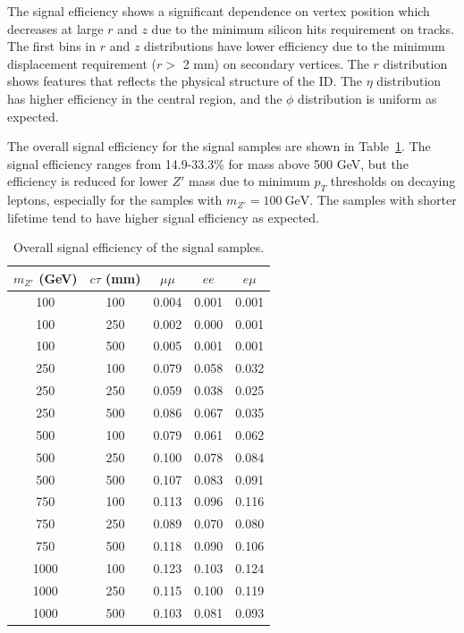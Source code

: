 The signal efficiency shows a significant dependence on vertex position which decreases at large $r$ and $z$ due to the minimum silicon hits requirement on tracks. The first bins in $r$ and $z$ distributions have lower efficiency due to the minimum displacement requirement ($r > $ 2 mm) on secondary vertices. The $r$ distribution shows features that reflects the physical structure of the ID. The $\eta$ distribution has higher efficiency in the central region, and the $\phi$ distribution is uniform as expected.

The overall signal efficiency for the signal samples are shown in Table~\ref{table:signal_eff}. The signal efficiency ranges from 14.9-33.3\% for mass above 500 GeV, but the efficiency is reduced for lower $Z'$ mass due to minimum $p_{T}$ thresholds on decaying leptons, especially for the samples with $m_{Z'}=100~\si{\GeV}$. The samples with shorter lifetime tend to have higher signal efficiency as expected. 

\begin{table}[!htb]
  \centering
  \begin{tabular}{ c c @{\hspace{1cm}} c @{\hspace{1cm}} c @{\hspace{1cm}} c }
    \hline
    \hline
    $m_{Z'}$ (GeV) & $c\tau$ (mm)   &$\mu\mu$  & $ee$  & $e\mu$ \\
    \hline
    100			   &  100	        &0.004	&0.001	&0.001   \\
    100			   &  250	        &0.002	&0.000	&0.001   \\
    100			   &  500	        &0.005	&0.001	&0.001   \\
    250			   &  100	        &0.079	&0.058	&0.032   \\
    250			   &  250	        &0.059	&0.038	&0.025   \\
    250			   &  500	        &0.086	&0.067	&0.035   \\
    500			   &  100	        &0.079	&0.061	&0.062   \\
    500			   &  250	        &0.100	&0.078	&0.084   \\
    500			   &  500	        &0.107	&0.083	&0.091   \\
    750			   &  100	        &0.113	&0.096	&0.116   \\
    750			   &  250	        &0.089	&0.070	&0.080   \\
    750			   &  500	        &0.118	&0.090	&0.106   \\
    1000	       &  100	        &0.123	&0.103	&0.124   \\
    1000	       &  250	        &0.115	&0.100	&0.119   \\
    1000	       &  500	        &0.103	&0.081	&0.093   \\
    \hline
    \hline
  \end{tabular}
  \caption{Overall signal efficiency of the signal samples.}
  \label{table:signal_eff}
\end{table}




